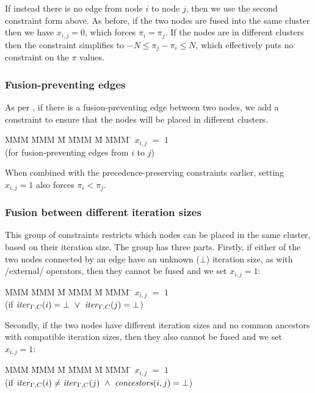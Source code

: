 If instead there is no edge from node $i$ to node $j$, then we use the second constraint form above.
As before, if the two nodes are fused into the same cluster then we have $x_{i,j} = 0$, which forces $\pi_i = \pi_j$.
If the nodes are in different clusters then the constraint simplifies to $-N \le \pi_j - \pi_i \le N$, which effectively puts no constraint on the $\pi$ values.


\subsubsection{Fusion-preventing edges}
As per \citet{megiddo1998optimal}, if there is a fusion-preventing edge between two nodes, we add a constraint to ensure that the nodes will be placed in different clusters.
\begin{tabbing}
MMM     \= MMM \= M  \= MMM \= M \= MMM \= \kill
        \> $x_{i,j}$ \> $=$ \> $1$ \>   \> \\
        \> (for fusion-preventing edges from $i$ to $j$) 
\end{tabbing}

When combined with the precedence-preserving constraints earlier, setting $x_{i,j} = 1$ also forces $\pi_i < \pi_j$. 


\subsubsection{Fusion between different iteration sizes}
This group of constraints restricts which nodes can be placed in the same cluster, based on their iteration size.
The group has three parts. 
Firstly, if either of the two nodes connected by an edge have an unknown ($\bot$) iteration size, as with \Hs/external/ operators, then they cannot be fused and we set $x_{i,j} = 1$:
\begin{tabbing}
MMM     \= MMM \= M \= MMM \= M \= MMM \= \kill
        \> $x_{i,j}$   \> $=$   \> $1$          \>       \>     \\
        \> (if $\mathit{iter}_{\Gamma,C}(i) = \bot 
                ~\vee~ \mathit{iter}_{\Gamma,C}(j) = \bot$)
\end{tabbing}

Secondly, if the two nodes have different iteration sizes and no common ancestors with compatible iteration sizes, then they also cannot be fused and we set $x_{i,j} = 1$:
\begin{tabbing}
MMM     \= MMM \= M \= MMM \= M \= MMM \= \kill
        \> $x_{i,j}$   \> $=$   \> $1$          \>       \>     \\
        \> (if $\mathit{iter}_{\Gamma,C}(i) \not= \mathit{iter}_{\Gamma,C}(j) 
                ~\wedge~ \mathit{concestors}(i,j) = \bot$)
\end{tabbing}

